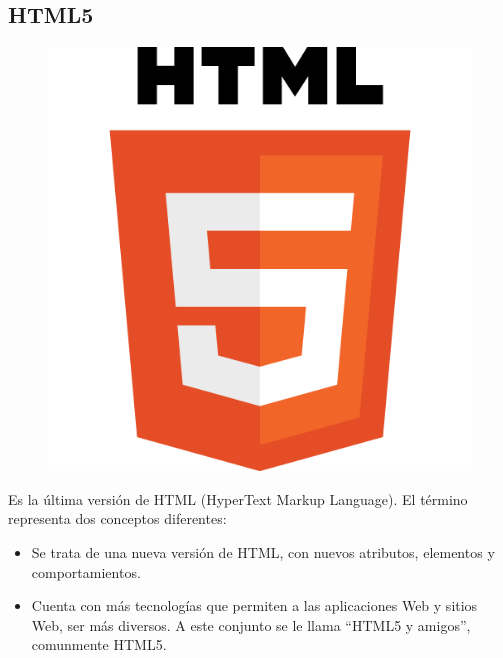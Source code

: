 \documentclass[a4paper, 12pt]{book}
\begin{document}
\subsection{HTML5} 
\begin{figure}[hbtp]
\centering
\includegraphics[scale=0.3]{img/HTML5.png} 
\end{figure}
Es la última versión de HTML (HyperText Markup Language). El término representa dos conceptos diferentes:
\begin{itemize}
\item Se trata de una nueva versión de HTML, con nuevos atributos, elementos y comportamientos.
\item Cuenta con más tecnologías que permiten a las aplicaciones Web y sitios Web, ser más diversos. A este conjunto se le llama ``HTML5 y amigos'', comunmente HTML5.
\end{itemize}
\end{document}
